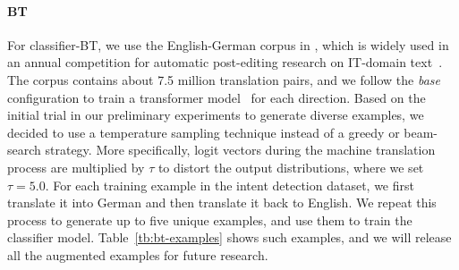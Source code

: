 \paragraph{BT}
For classifier-BT, we use the English-German corpus in \citet{escape}, which is widely used in an annual competition for automatic post-editing research on IT-domain text~\citep{ape-2019}.
The corpus contains about 7.5 million translation pairs, and we follow the {\it base} configuration to train a transformer model~\citep{transformer} for each direction.
Based on the initial trial in our preliminary experiments to generate diverse examples, we decided to use a temperature sampling technique instead of a greedy or beam-search strategy.
More specifically, logit vectors during the machine translation process are multiplied by $\tau$ to distort the output distributions, where we set $\tau = 5.0$.
For each training example in the intent detection dataset, we first translate it into German and then translate it back to English.
We repeat this process to generate up to five unique examples, and use them to train the classifier model.
Table~\ref{tb:bt-examples} shows such examples, and we will release all the augmented examples for future research.

